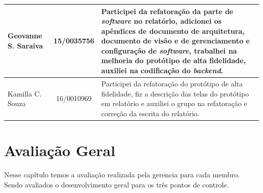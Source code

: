 \begin{apendicesenv}
\begin{table}[H]
\begin{adjustbox}{max width = \textwidth}
\begin{tabular}{|G{4cm}|c|L{10cm}|}
        Geovanne S. Saraiva &  15/0035756 &  Participei da refatoração da parte de \textit{software} no relatório, adicionei os apêndices de documento de arquitetura, documento de visão e de gerenciamento e configuração de \textit{software}, trabalhei na melhoria do protótipo de alta fidelidade, auxiliei na codificação do \textit{backend}. \\ \hline
        Kamilla C. Souza &  16/0010969 & Participei da refatoração do protótipo de alta fidelidade, fiz a descrição das telas do protótipo em relatório e auxiliei o grupo na refatoração e correção da escrita do relatório.\\ \hline

        \end{tabular}
    \end{adjustbox}
\end{table}



\chapter{Avaliação Geral}

Nesse capítulo temos a avaliação realizada pela gerencia para cada membro. Sendo avaliados o desenvolvimento geral para os três pontos de controle.


\end{apendicesenv}
